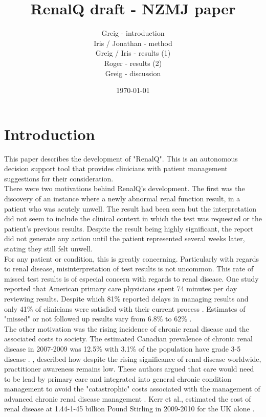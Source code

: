 \documentclass[11pt]{article}
\title{\textbf{RenalQ draft - NZMJ paper}}
\author{Greig - introduction\\
		Iris / Jonathan - method\\
		Greig / Iris - results (1)\\
		Roger - results (2)\\
		Greig - discussion}
\date{\today}
\begin{document}
\maketitle


\section{Introduction}

This paper describes the development of "RenalQ". This is an autonomous decision support tool that provides clinicians with patient management suggestions for their consideration.\\

There were two motivations behind RenalQ's development. The first was the discovery of an instance where a newly abnormal renal function result, in a patient who was acutely unwell. The result had been seen but the interpretation did not seem to include the clinical context in which the test was requested or the patient's previous results. Despite the result being highly significant, the report did not generate any action until the patient represented several weeks later, stating they still felt unwell.\\ 

For any patient or condition, this is greatly concerning. Particularly with regards to renal disease, misinterpretation of test results is not uncommon. This rate of missed test results is of especial concern with regards to renal disease. One study reported that American primary care physicians spent 74 minutes per day reviewing results. Despite which 81\% reported delays in managing results and only 41\% of clinicians were satisfied with their current process \citep{poon2004wish}. Estimates of "missed" or not followed up results vary from 6.8\% to 62\% \citep{callen2012failure}.\\

The other motivation was the rising incidence of chronic renal disease and the associated costs to society. The estimated Canadian prevalence of chronic renal disease in 2007-2009 was 12.5\% with 3.1\% of the population have grade 3-5 disease \citep{arora2013prevalence}. \citep{anachronistic}, described how despite the rising significance of renal disease worldwide, practitioner awareness remains low. These authors argued that care would need to be lead by primary care and integrated into general chronic condition management to avoid the "catastrophic" costs associated with the management of advanced chronic renal disease management \citep{jha2013chronic}. Kerr et al., estimated the cost of renal disease at 1.44-1-45 billion Pound Stirling in 2009-2010 for the UK alone \citep{underestimating}.\\
\end{document}
